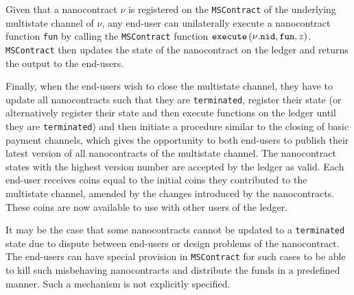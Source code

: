   Given that a nanocontract $\nu$ is registered on the \texttt{MSContract} of the
  underlying multistate channel of $\nu$, any end-user can unilaterally execute a
  nanocontract function \texttt{fun} by calling the \texttt{MSContract} function
  $\mbox{\texttt{execute}}\left(\nu\mbox{.\texttt{nid}}, \mbox{\texttt{fun}}, z\right)$.
  \texttt{MSContract} then updates the state of the nano\-contract on the ledger and
  returns the output to the end-users.

  Finally, when the end-users wish to close the multistate channel, they have to update
  all nanocontracts such that they are \texttt{terminated}, register their state (or
  alternatively register their state and then execute functions on the ledger until they
  are \texttt{terminated}) and then initiate a procedure similar to the closing of basic
  payment channels, which gives the opportunity to both end-users to publish their latest
  version of all nanocontracts of the multistate channel. The nanocontract states with the
  highest version number are accepted by the ledger as valid. Each end-user receives coins
  equal to the initial coins they contributed to the multistate channel, amended by the
  changes introduced by the nanocontracts. These coins are now available to use with other
  users of the ledger.

  It may be the case that some nanocontracts cannot be updated to a \texttt{terminated}
  state due to dispute between end-users or design problems of the nanocontract. The
  end-users can have special provision in \texttt{MSContract} for such cases to be able to
  kill such misbehaving nanocontracts and distribute the funds in a predefined manner.
  Such a mechanism is not explicitly specified.
